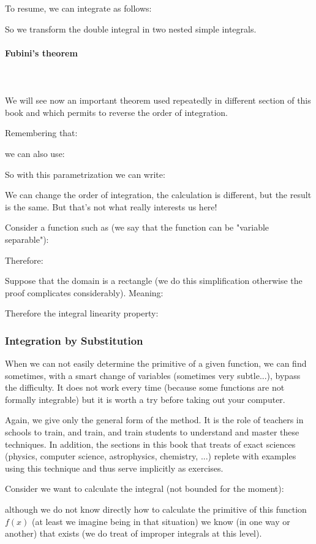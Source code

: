 	
	To resume, we can integrate as follows:
	
	So we transform the double integral in two nested simple integrals.
	
	\paragraph{Fubini's theorem}\mbox{}\\\\
	We will see now an important theorem used repeatedly in different section of this book and which permits to reverse the order of integration.
	
	Remembering that:
	
	we can also use:
	
	So with this parametrization we can write:
	
	We can change the order of integration, the calculation is different, but the result is the same. But that's not what really interests us here!
	
	Consider a function such as (we say that the function can be "variable separable"):
	
	Therefore:
	
	Suppose that the domain is a rectangle (we do this simplification otherwise the proof complicates considerably). Meaning:
	
	Therefore the integral linearity property:
	
	
	\subsubsection{Integration by Substitution}
	When we can not easily determine the primitive of a given function, we can find sometimes, with a smart change of variables (sometimes very subtle...), bypass the difficulty. It does not work every time (because some functions are not formally integrable) but it is worth a try before taking out your computer.
	
	Again, we give only the general form of the method. It is the role of teachers in schools to train, and train, and train students to understand and master these techniques. In addition, the sections in this book that treats of exact sciences (physics, computer science, astrophysics, chemistry, ...) replete with examples using this technique and thus serve implicitly as exercises.
	
	Consider we want to calculate the integral (not bounded for the moment):
	
	although we do not know directly how to calculate the primitive of this function $f (x)$ (at least we imagine being in that situation) we know (in one way or another) that exists (we do treat of improper integrals at this level).

